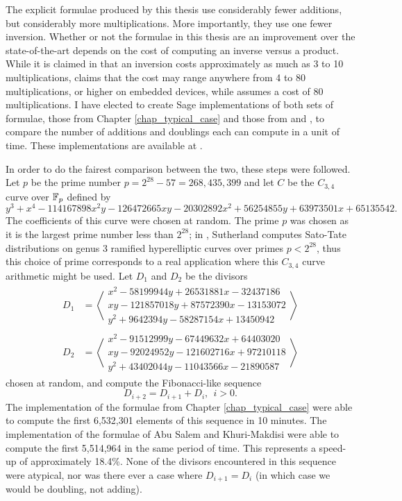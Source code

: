 The explicit formulae produced by this thesis use considerably fewer additions, but considerably more multiplications.
More importantly, they use one fewer inversion.
Whether or not the formulae in this thesis are an improvement over the state-of-the-art depends
on the cost of computing an inverse versus a product.
While it is claimed in \cite{salem07} that an inversion costs approximately as much as 3 to 10 multiplications,
\cite{dahmen07} claims that the cost may range anywhere from 4 to 80 multiplications, or higher on embedded devices,
while \cite{hankerson04} assumes a cost of 80 multiplications.
I have elected to create Sage implementations of both sets of formulae,
those from Chapter \ref{chap_typical_case} and those from \cite{salem07} and \cite{kmakdisi18},
to compare the number of additions and doublings each can compute in a unit of time.
These implementations are available at \cite{github}.

In order to do the fairest comparison between the two, these steps were followed.
Let $p$ be the prime number $p = 2^{28} - 57 = 268,435,399$
and let $C$ be the $C_{3,4}$ curve over $\mathbb{F}_p$ defined by
 \[y^3 + x^4 - 114167898x^2y - 126472665xy - 20302892x^2 + 56254855y + 63973501x + 65135542.\]
The coefficients of this curve were chosen at random.
The prime $p$ was chosen as it is the largest prime number less than $2^{28}$;
in \cite{sutherland16}, Sutherland computes Sato-Tate distributions
on genus 3 ramified hyperelliptic curves over primes $p < 2^{28}$,
thus this choice of prime corresponds to a real application where this $C_{3,4}$ curve arithmetic might be used.
Let $D_1$ and $D_2$ be the divisors
\begin{align*}
  D_1 &= \left\langle \begin{array}{r}
    x^2 -  58199944y + 26531881x - 32437186 \\
     xy - 121857018y + 87572390x - 13153072 \\
    y^2 +   9642394y - 58287154x + 13450942
  \end{array} \right\rangle \\
  D_2 &= \left\langle \begin{array}{r}
    x^2 - 91512999y -  67449632x + 64403020 \\
     xy - 92024952y - 121602716x + 97210118 \\
    y^2 + 43402044y - 11043566x  - 21890587
  \end{array} \right\rangle
\end{align*}
chosen at random, and compute the Fibonacci-like sequence 
  \[ D_{i+2} = D_{i+1} + D_i, ~~ i > 0. \]
The implementation of the formulae from Chapter \ref{chap_typical_case} were able to compute
the first 6,532,301 elements of this sequence in 10 minutes.
The implementation of the formulae of Abu Salem and Khuri-Makdisi were able to compute
the first 5,514,964 in the same period of time.
This represents a speed-up of approximately 18.4\%.
None of the divisors encountered in this sequence were atypical,
nor was there ever a case where $D_{i+1} = D_{i}$
(in which case we would be doubling, not adding).

